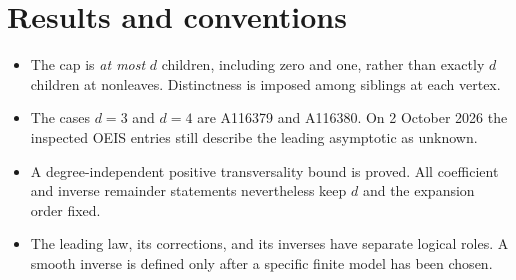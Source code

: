 \documentclass[11pt]{article}
\theoremstyle{definition}\newtheorem{definition}[theorem]{Definition}
\theoremstyle{remark}\newtheorem{remark}[theorem]{Remark}
\begin{document}
\section*{Results and conventions}
\begin{itemize}
\item The cap is \emph{at most} $d$ children, including zero and one, rather than exactly $d$ children at nonleaves. Distinctness is imposed among siblings at each vertex.
\item The cases $d=3$ and $d=4$ are A116379 and A116380. On 2 October 2026 the inspected OEIS entries still describe the leading asymptotic as unknown.
\item A degree-independent positive transversality bound is proved. All coefficient and inverse remainder statements nevertheless keep $d$ and the expansion order fixed.
\item The leading law, its corrections, and its inverses have separate logical roles. A smooth inverse is defined only after a specific finite model has been chosen.
\end{itemize}
\end{document}
